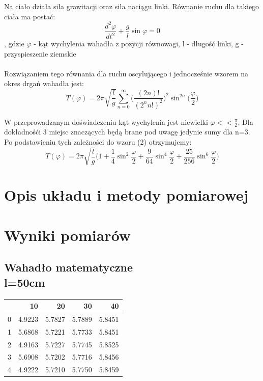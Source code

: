 \documentclass[a4paper,10pt]{article}
\begin{document}
Na ciało działa siła grawitacji oraz siła naciągu linki. Równanie ruchu dla takiego ciała ma postać:
\begin{equation}
\frac{d^2\varphi}{dt^2} + \frac{g}{l}\sin\varphi = 0
\end{equation}
, gdzie $\varphi$ - kąt wychylenia wahadła z pozycji równowagi, l - długość linki, g - przyspieszenie ziemskie
\\
\\Rozwiązaniem tego równania dla ruchu oscylującego i jednocześnie wzorem na okres drgań wahadła jest:
\begin{equation}
T(\varphi) = 2\pi\sqrt{\frac{l}{g}}\sum_{n=0}^{\infty}\bigg(\frac{(2n)!}{(2^nn!)^2}\bigg)^2\sin^{2n}\bigg(\frac{\varphi}{2}\bigg)
\end{equation}

W przeprowadzanym doświadczeniu kąt wychylenia jest niewielki $\varphi<<\frac{\pi}{2}$. Dla dokładnośći 3 miejsc znaczących będą brane pod uwagę jedynie sumy dla n=3. Po podstawieniu tych zależności do wzoru (2) otrzymujemy:
\begin{equation}
T(\varphi) = 2\pi\sqrt{\frac{l}{g}}\bigg(1+\frac{1}{4}\sin^2\frac{\varphi}{2}+\frac{9}{64}\sin^4\frac{\varphi}{2}+\frac{25}{256}\sin^6\frac{\varphi}{2}\bigg)
\end{equation}


\section{Opis układu i metody pomiarowej}


\section{Wyniki pomiarów}
\subsection{Wahadło matematyczne\\l=50cm}
\begin{tabular}{lrrrr}
\toprule
{} &      10 &      20 &      30 &      40 \\
\midrule
0 &  4.9223 &  5.7827 &  5.7889 &  5.8451 \\
1 &  5.6868 &  5.7221 &  5.7733 &  5.8451 \\
2 &  4.9163 &  5.7227 &  5.7745 &  5.8525 \\
3 &  5.6908 &  5.7202 &  5.7716 &  5.8456 \\
4 &  4.9222 &  5.7210 &  5.7750 &  5.8459 \\
\bottomrule
\end{tabular}
\end{document}
